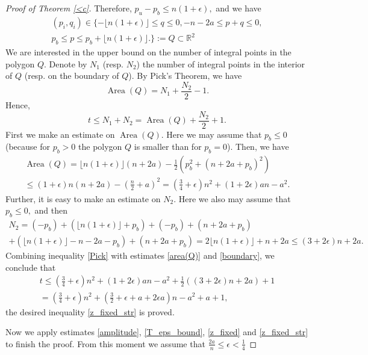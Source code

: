 \documentclass[11pt,leqno]{amsart}
\numberwithin{equation}{section}
\def\R{\mathbb{R}}
\newcommand{\Area}{\operatorname{Area}}
\begin{document}
\begin{proof}[Proof of Theorem \ref{<c}]
Therefore, $p_u-p_b\leq n(1+\epsilon),$ and we have
\begin{multline}(p_i,q_i)\in\{-\lfloor n(1+\epsilon)\rfloor\leq q\leq 0,-n-2a\leq p+q\leq 0,\\ p_b\leq p\leq p_b+\lfloor n(1+\epsilon)\rfloor.\}
:=Q\subset \R^2\end{multline}
We are interested in the upper bound on the number of integral points in the polygon $Q.$ Denote by $N_1$ (resp. $N_2$) the number of integral
points in the interior of $Q$ (resp. on the boundary of $Q$). By Pick's Theorem, we have
$$\Area(Q)=N_1+\frac{N_2}2-1.$$
Hence,
\begin{equation}\label{Pick}t\leq N_1+N_2=\Area(Q)+\frac{N_2}2+1.\end{equation}
First we make an estimate on $\Area(Q).$ Here we may assume that $p_b\leq 0$ (because for $p_b>0$ the polygon $Q$ is smaller than for $p_b=0$).
Then, we have
\begin{multline}\label{area(Q)}\Area(Q)=\lfloor n(1+\epsilon)\rfloor(n+2a)-\frac12(p_b^2+(n+2a+p_b)^2)\\
\leq (1+\epsilon)n(n+2a)-(\frac{n}2+a)^2=(\frac34+\epsilon)n^2+(1+2\epsilon)an-a^2.\end{multline}
Further, it is easy to make an estimate on $N_2.$ Here we also may assume that $p_b\leq 0,$ and then
\begin{multline}\label{boundary}N_2=(-p_b)+(\lfloor n(1+\epsilon)\rfloor+p_b)+(-p_b)+(n+2a+p_b)
\\+(\lfloor n(1+\epsilon)\rfloor-n-2a-p_b)+(n+2a+p_b)=2\lfloor n(1+\epsilon)\rfloor+n+2a\leq (3+2\epsilon)n+2a.\end{multline}
Combining inequality \eqref{Pick} with estimates \eqref{area(Q)} and \eqref{boundary}, we conclude that
\begin{multline*}t\leq (\frac34+\epsilon)n^2+(1+2\epsilon)an-a^2+\frac12((3+2\epsilon)n+2a)+1\\
=(\frac34+\epsilon)n^2+(\frac32+\epsilon+a+2\epsilon a)n-a^2+a+1,\end{multline*}
the desired inequality \eqref{z_fixed_str} is proved.


\smallskip



{}

Now we apply estimates \eqref{amplitude}, \eqref{T_eps_bound}, \eqref{z_fixed} and \eqref{z_fixed_str} to finish the proof. From this moment we assume that $\frac{2a}{n}\leq \epsilon<\frac14$


\end{proof}
\end{document}
